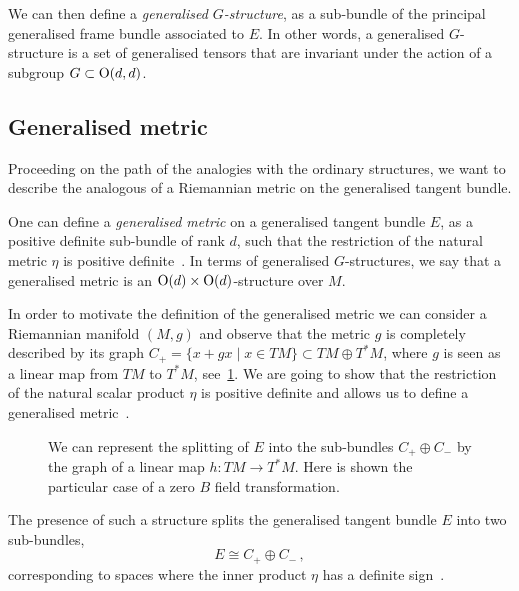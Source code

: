 \documentclass[debug]{phd}
\begin{document}
						We can then define a \emph{generalised $G$-structure}, as a sub-bundle of the principal generalised frame bundle associated to $E$.
						In other words, a generalised $G$-structure is a set of generalised tensors that are invariant under the action of a subgroup $G \subset \mathrm{O}(d,d)$.
					\subsection{Generalised metric}\label{genmetrOdd}
						Proceeding on the path of the analogies with the ordinary structures, we want to describe the analogous of a Riemannian metric on the generalised tangent bundle.
						
						One can define a \emph{generalised metric} on a generalised tangent bundle $E$, as a positive definite sub-bundle of rank $d$, such that the restriction of the natural metric $\eta$ is positive definite~\cite[def. 4.1.1]{baraglia}.
						In terms of generalised $G$-structures, we say that a generalised metric is an $\mathrm{O}(d) \times \mathrm{O}(d)$-structure over $M$.
						
						In order to motivate the definition of the generalised metric we can consider a Riemannian manifold $(M,g)$ and observe that the metric $g$ is completely described by its graph $C_{+} = \{ x+gx \mid x \in TM \} \subset TM \oplus T^*M$, where $g$ is seen as a linear map from $TM$ to $T^*M$, see~\cref{graph}. 
						We are going to show that the restriction of the natural scalar product $\eta$ is positive definite and allows us to define a generalised metric~\cite{baraglia}.
								\begin{figure}
								\centering
									
									\caption{We can represent the splitting of $E$ into the sub-bundles $C_{+} \oplus C_{-}$ by the graph of a linear map $h: TM \longrightarrow T^*M$. 
									Here is shown the particular case of a zero $B$ field transformation.}
									\label{graph}
								\end{figure}
												
						The presence of such a structure splits the generalised tangent bundle $E$ into two sub-bundles,
								\begin{equation}
									E \cong C_+ \oplus C_- \, ,
								\end{equation}
						corresponding to spaces where the inner product $\eta$ has a definite sign~\cite{gualtphd, petrini3}.
						
\end{document}
